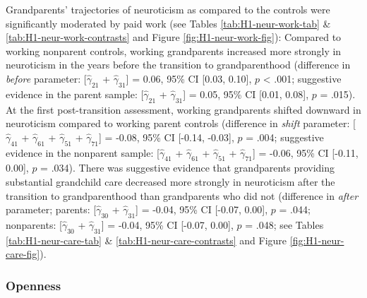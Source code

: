 \documentclass[
  english,
  man, noextraspace]{apa7}
\begin{document}
Grandparents' trajectories of neuroticism as compared to the controls were significantly moderated by paid work (see Tables \ref{tab:H1-neur-work-tab} \& \ref{tab:H1-neur-work-contrasts} and Figure \ref{fig:H1-neur-work-fig}): Compared to working nonparent controls, working grandparents increased more strongly in neuroticism in the years before the transition to grandparenthood (difference in \emph{before} parameter: {[}\(\hat{\gamma}_{21}\) + \(\hat{\gamma}_{31}\){]} = 0.06, 95\% CI {[}0.03, 0.10{]}, \(p\) \textless{} .001; suggestive evidence in the parent sample: {[}\(\hat{\gamma}_{21}\) + \(\hat{\gamma}_{31}\){]} = 0.05, 95\% CI {[}0.01, 0.08{]}, \(p\) = .015). At the first post-transition assessment, working grandparents shifted downward in neuroticism compared to working parent controls (difference in \emph{shift} parameter: {[}\(\hat{\gamma}_{41}\) + \(\hat{\gamma}_{61}\) + \(\hat{\gamma}_{51}\) + \(\hat{\gamma}_{71}\){]} = -0.08, 95\% CI {[}-0.14, -0.03{]}, \(p\) = .004; suggestive evidence in the nonparent sample: {[}\(\hat{\gamma}_{41}\) + \(\hat{\gamma}_{61}\) + \(\hat{\gamma}_{51}\) + \(\hat{\gamma}_{71}\){]} = -0.06, 95\% CI {[}-0.11, 0.00{]}, \(p\) = .034). There was suggestive evidence that grandparents providing substantial grandchild care decreased more strongly in neuroticism after the transition to grandparenthood than grandparents who did not (difference in \emph{after} parameter; parents: {[}\(\hat{\gamma}_{30}\) + \(\hat{\gamma}_{31}\){]} = -0.04, 95\% CI {[}-0.07, 0.00{]}, \(p\) = .044; nonparents: {[}\(\hat{\gamma}_{30}\) + \(\hat{\gamma}_{31}\){]} = -0.04, 95\% CI {[}-0.07, 0.00{]}, \(p\) = .048; see Tables \ref{tab:H1-neur-care-tab} \& \ref{tab:H1-neur-care-contrasts} and Figure \ref{fig:H1-neur-care-fig}).

\hypertarget{openness}{%
\subsubsection{Openness}\label{openness}}
\end{document}
